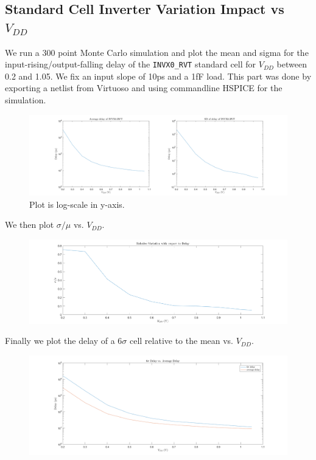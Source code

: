 \documentclass[11pt]{article}
\begin{document}
\subsection{Standard Cell Inverter Variation Impact vs $V_{DD}$}
We run a 300 point Monte Carlo simulation and plot the mean and sigma for the input-rising/output-falling delay of the \verb|INVX0_RVT| standard cell for $V_{DD}$ between 0.2 and 1.05. We fix an input slope of 10ps and a 1fF load. This part was done by exporting a netlist from Virtuoso and using commandline HSPICE for the simulation.

\begin{figure}[H]
	\centerline{\includegraphics[width=\textwidth+4cm]{delay_vs_vdd.png}}
	\caption{Plot is log-scale in y-axis.}
\end{figure}

We then plot $\sigma / \mu$ vs. $V_{DD}$.

\begin{figure}[H]
	\centerline{\includegraphics[width=\textwidth+4cm]{relative_delay_variation_vs_vdd.png}}
\end{figure}

Finally we plot the delay of a $6 \sigma$ cell relative to the mean vs. $V_{DD}$.

\begin{figure}[H]
	\centerline{\includegraphics[width=\textwidth+4cm]{six_sigma_delay_vs_vdd.png}}
\end{figure}
\end{document}
